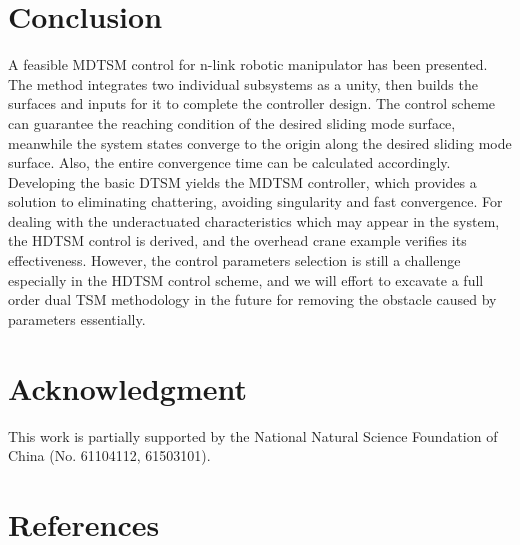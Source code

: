 \documentclass[3p]{elsarticle}
\theoremstyle{plain}
\theoremstyle{remark}
\begin{document}
\section{Conclusion}\label{sec:5}
A feasible MDTSM control for n-link robotic manipulator has been presented. The method integrates two individual subsystems as a unity, then builds the surfaces and inputs for it to complete the controller design. The control scheme can guarantee the reaching condition of the desired sliding mode  surface, meanwhile the system states converge to the origin along the desired sliding mode  surface. Also, the entire convergence time can be calculated accordingly. Developing the basic DTSM yields the MDTSM controller, which provides a solution to eliminating chattering, avoiding singularity and fast convergence. For dealing with the underactuated characteristics which may appear in the system, the HDTSM control is derived, and the overhead crane example verifies its effectiveness. However, the control parameters selection is still a challenge especially in the HDTSM control scheme, and we will effort to excavate a full order dual TSM methodology in the future for removing the obstacle caused by parameters essentially.
\section{Acknowledgment}
This work is partially supported by the National Natural Science Foundation of China (No. 61104112, 61503101).
\section{References}


\end{document}
